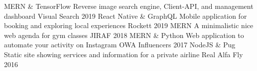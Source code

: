 \begin{cvhonors}
  \cvhonor
    {MERN \& TensorFlow}
    {Reverse image search engine, Client-API, and management dashboard}
    {Visual Search}
    {2019}
  \cvhonor
    {React Native \& GraphQL}
    {Mobile application for booking and exploring local experiences}
    {Rockett}
    {2019}
  \cvhonor
    {MERN}
    {A minimalistic nice web agenda for gym classes}
    {JIRAF}
    {2018}
  \cvhonor
    {MERN \& Python}
    {Web application to automate your activity on Instagram}
    {OWA Influencers}
    {2017}
  \cvhonor
    {NodeJS \& Pug}
    {Static site showing services and information for a private airline}
    {Real Alfa Fly}
    {2016}
\end{cvhonors}
